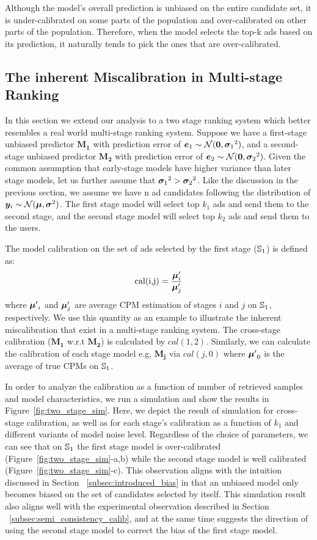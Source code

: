 {Although the model's overall prediction is unbiased on the entire candidate set, it is under-calibrated on some parts of the population and over-calibrated on other parts of the population. Therefore, when the model selects the top-k ads based on its prediction, it naturally tends to pick the ones that are over-calibrated. 

\subsection{The inherent Miscalibration in Multi-stage Ranking}
\label{subsec:inherent_miscalibration}
In this section we extend our analysis to a two stage ranking system which better resembles a real world multi-stage ranking system. Suppose we have a first-stage unbiased predictor $\mathbf{M_1}$ with prediction error of ${\bm{e}}_1\sim{\mathcal{N}}({\bm{0}}, {{\bm{\sigma}}_1}^2)$, and a second-stage unbiased predictor $\mathbf{M_2}$ with prediction error of ${\bm{e}}_2\sim{\mathcal{N}}({\bm{0}}, {{\bm{\sigma}}_2}^2)$.
Given the common assumption that early-stage models have higher variance than later stage models, let us further assume that ${{\bm{\sigma}}_1}^2>{{\bm{\sigma}}_2}^2$. Like the discussion in the previous section, we assume we have n ad candidates following the distribution of ${\bm{y}}_i\sim{\mathcal{N}}({\bm{\mu}}, {\bm{\sigma}}^2)$. The first stage model will select top $k_1$ ads and send them to the second stage, and the second stage model will select top $k_2$ ads and send them to the users. 

The model calibration on the set of ads selected by the first stage (${\mathbb{S}}_1$) is defined as:
\begin{equation}
    \text{cal(i,j)}=\frac{{\bm{\mu}}'_i}{{\bm{\mu}}'_j}
\end{equation}
where ${{\bm{\mu}}'}_i$ and ${\bm{\mu}}'_j$ are average CPM estimation of stages $i$ and $j$ on ${\mathbb{S}}_1$, respectively. We use this quantity as an example to illustrate the inherent miscalibration that exist in a multi-stage ranking system. The cross-stage calibration ($\mathbf{M_1}$ w.r.t $\mathbf{M_2}$) is calculated by $cal(1,2)$.
Similarly, we can calculate the calibration of each stage model e.g, $\mathbf{M_j}$ via $cal(j,0)$ where ${{\bm{\mu}}'}_0$ is the average of true CPMs on ${\mathbb{S}}_1$.  

In order to analyze the calibration as a function of number of retrieved samples and model characteristics, we run a simulation and show the results in Figure~\ref{fig:two_stage_sim}.
Here, we depict the result of simulation for cross-stage calibration, as well as for each stage's calibration as a function of $k_1$ and different variants of model noise level. 
Regardless of the choice of parameters, we can see that on ${\mathbb{S}}_1$ the first stage model is over-calibrated (Figure~\ref{fig:two_stage_sim}-a,b) while the second stage model is well calibrated (Figure~\ref{fig:two_stage_sim}-c). This observation aligns with the intuition discussed in Section ~\ref{subsec:introduced_bias} in that an unbiased model only becomes biased on the set of candidates selected by itself. This simulation result also aligns well with the experimental observation described in Section ~\ref{subsec:semi_consistency_calib}, and at the same time suggests the direction of using the second stage model to correct the bias of the first stage model. 


}
